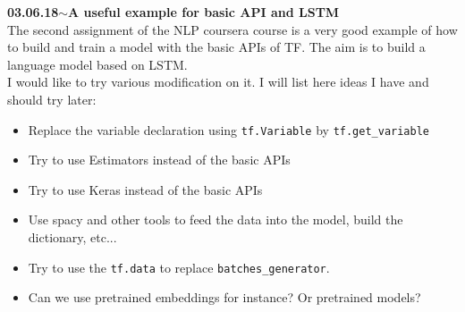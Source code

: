 \documentclass[11pt,a4paper]{article}
\newenvironment{loggentry}[2]%
{\noindent\textbf{#1}\hspace{1cm}$\mathbf{\sim}$\text{ }\textbf{#2}\\}{\vspace{0.5cm}}
\begin{document}
\begin{loggentry}{03.06.18}{A useful example for basic API and LSTM}
The second assignment of the NLP coursera course is a very good example of how to build and train a model with the basic APIs of TF. The aim is to build a language model based on LSTM.\\
I would like to try various modification on it. I will list here ideas I have and should try later:
\begin{itemize}
\item Replace the variable declaration using \texttt{tf.Variable} by \texttt{tf.get\_variable}
\item Try to use Estimators instead of the basic APIs
\item Try to use Keras instead of the basic APIs
\item Use spacy and other tools to feed the data into the model, build the dictionary, etc...
\item Try to use the \texttt{tf.data} to replace \texttt{batches\_generator}.
\item Can we use pretrained embeddings for instance? Or pretrained models?
\end{itemize}
\end{loggentry}
\end{document}
